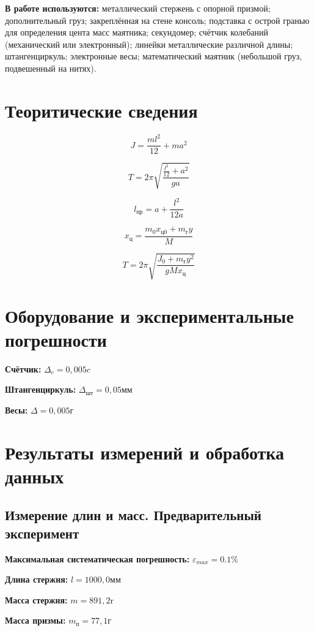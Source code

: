 \documentclass[a4paper, 12pt]{article}
\begin{document}
\noindent \textbf{В работе используются:} металлический стержень с опорной призмой; дополнительный груз; закреплённая на стене консоль; подставка с острой гранью для определения цента масс маятника; секундомер; счётчик колебаний (механический или электронный); линейки металлические различной длины; штангенциркуль; электронные весы; математический маятник (небольшой груз, подвешенный на нитях).

\section*{Теоритические сведения}

\[J=\frac{ml^2}{12}+ma^2\]

\[T=2\pi\sqrt{\frac{\frac{l^2}{12}+a^2}{ga}}\]

\[l_\text{пр}=a+\frac{l^2}{12a}\]

\[x_\text{ц}=\frac{m_0x_\text{ц0}+m_\text{г}y}{M}\]

\[T=2\pi\sqrt{\frac{J_0+m_\text{г}y^2}{gMx_\text{ц}}}\]

\section*{Оборудование и экспериментальные погрешности}

\noindent \textbf{Счётчик:} $\Delta_c=0,005c$

\noindent \textbf{Штангенциркуль:} $\Delta_{\text{шт}}=0,05\text{мм}$

\noindent \textbf{Весы:} $\Delta=0,005\text{г}$ 

\newpage

\section*{Результаты измерений и обработка данных}

\subsection*{Измерение длин и масс. Предварительный эксперимент}

\noindent \textbf{Максимальная систематическая погрешность:} $\varepsilon_{max}=0.1\%$

\noindent \textbf{Длина стержня:} $l=1000,0\text{мм}$

\noindent \textbf{Масса стержня:} $m=891,2\text{r}$

\noindent \textbf{Масса призмы:} $m_{\text{п}}=77,1\text{г}$
\end{document}
